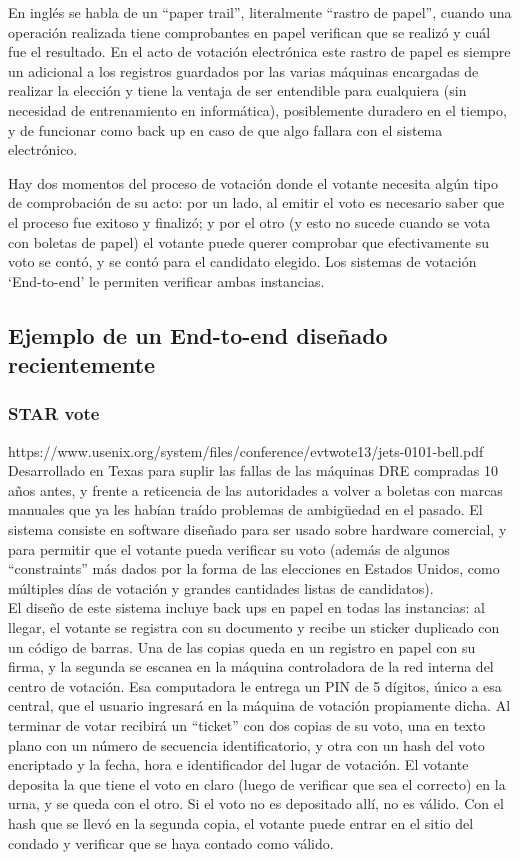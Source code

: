 En inglés se habla de un “paper trail”, literalmente “rastro de papel”, cuando una operación realizada tiene comprobantes en papel verifican que se realizó y cuál fue el resultado. En el acto de votación electrónica este rastro de papel es siempre un adicional a los registros guardados por las varias máquinas encargadas de realizar la elección y tiene la ventaja de ser entendible para cualquiera (sin necesidad de entrenamiento en informática), posiblemente duradero en el tiempo, y de funcionar como back up en caso de que algo fallara con el sistema electrónico.

Hay dos momentos del proceso de votación donde el votante necesita algún tipo de comprobación de su acto: por un lado, al emitir el voto es necesario saber que el proceso fue exitoso y finalizó; y por el otro (y esto no sucede cuando se vota con boletas de papel) el votante puede querer comprobar que efectivamente su voto se contó, y se contó para el candidato elegido. Los sistemas de votación ‘End-to-end’ le permiten verificar ambas instancias.

\subsection{Ejemplo de un End-to-end diseñado recientemente}

\subsubsection{STAR vote}
https://www.usenix.org/system/files/conference/evtwote13/jets-0101-bell.pdf
Desarrollado en Texas para suplir las fallas de las máquinas DRE compradas 10 años antes, y frente a reticencia de las autoridades a volver a boletas con marcas manuales que ya les habían traído problemas de ambigüedad en el pasado.
El sistema consiste en software diseñado para ser usado sobre hardware comercial, y para permitir que el votante pueda verificar su voto (además de algunos “constraints” más dados por la forma de las elecciones en Estados Unidos, como múltiples días de votación y grandes cantidades listas de candidatos).\\

El diseño de este sistema incluye back ups en papel en todas las instancias: al llegar, el votante se registra con su documento y recibe un sticker duplicado con un código de barras. Una de las copias queda en un registro en papel con su firma, y la segunda se escanea en la máquina controladora de la red interna del centro de votación. Esa computadora le entrega un PIN de 5 dígitos, único a esa central, que el usuario ingresará en la máquina de votación propiamente dicha. Al terminar de votar recibirá un “ticket” con dos copias de su voto, una en texto plano con un número de secuencia identificatorio, y otra con un hash del voto encriptado y la fecha, hora e identificador del lugar de votación. El votante deposita la que tiene el voto en claro (luego de verificar que sea el correcto) en la urna, y se queda con el otro. Si el voto no es depositado allí, no es válido. Con el hash que se llevó en la segunda copia, el votante puede entrar en el sitio del condado y verificar que se haya contado como válido.\\

